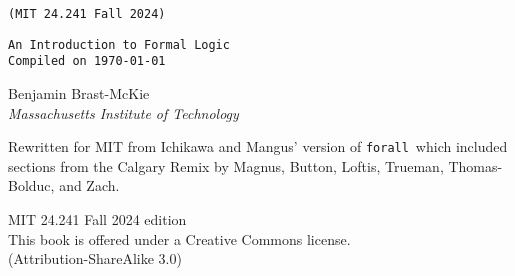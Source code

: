 
\thispagestyle{empty}
{\Huge\forallx} \hfill {\LARGE \texttt{(MIT 24.241 Fall 2024)}} %

{\tt An Introduction to Formal Logic\\
Compiled on \today}

\vspace{.5in}



{\sf Benjamin Brast-McKie}\\
\emph{Massachusetts Institute of Technology}




{\sf Rewritten for MIT from Ichikawa and Mangus' version of {\tt forall}\ which included sections from the Calgary Remix by Magnus, Button, Loftis, Trueman, Thomas-Bolduc, and Zach.}





\vfill




{\sf
	MIT 24.241 Fall 2024 edition \\%
	This book is offered under a Creative Commons license.\\
	(Attribution-ShareAlike 3.0)
}



\newpage
\thispagestyle{empty}%


%

